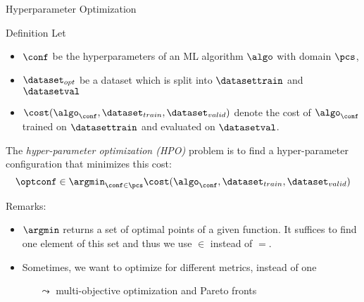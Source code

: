 \begin{frame}[c]{Hyperparameter Optimization}

\begin{block}{Definition}
	Let 
	\begin{itemize}
		\item $\conf$ be the hyperparameters of an ML algorithm $\algo$ with domain $\pcs$,
		\pause
		\item $\dataset_{opt}$ be a dataset which is split into $\datasettrain$ and $\datasetval$ 
		\pause
		\item $\cost(\algo_{\conf}, \dataset_{train}, \dataset_{valid})$ denote the cost of $\algo_{\conf}$ trained on $\datasettrain$ and evaluated on $\datasetval$.
	\end{itemize}
	\pause
	The \emph{hyper-parameter optimization (HPO)} problem is to find a hyper-parameter configuration that minimizes this cost:
	\begin{equation}
	\optconf \in \argmin_{\conf \in \pcs} \cost(\algo_{\conf}, \dataset_{train}, \dataset_{valid}) \nonumber  
	\end{equation}
\end{block}

\pause
Remarks: 

\begin{itemize}
	\item $\argmin$ returns a set of optimal points of a given function. It suffices to find one element of this set and thus we use $\in$ instead of $=$.
	\pause
	\item Sometimes, we want to optimize for different metrics, instead of one
	\begin{itemize}
		\item[$\leadsto$] multi-objective optimization and Pareto fronts
	\end{itemize}
\end{itemize}

\end{frame}
